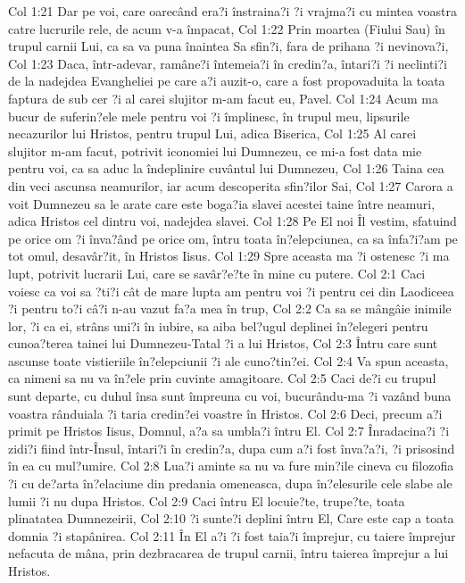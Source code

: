 Col 1:21  Dar pe voi, care oarecând era?i înstraina?i ?i vrajma?i cu mintea voastra catre lucrurile rele, de acum v-a împacat,
Col 1:22  Prin moartea (Fiului Sau) în trupul carnii Lui, ca sa va puna înaintea Sa sfin?i, fara de prihana ?i nevinova?i,
Col 1:23  Daca, într-adevar, ramâne?i întemeia?i în credin?a, întari?i ?i neclinti?i de la nadejdea Evangheliei pe care a?i auzit-o, care a fost propovaduita la toata faptura de sub cer ?i al carei slujitor m-am facut eu, Pavel.
Col 1:24  Acum ma bucur de suferin?ele mele pentru voi ?i împlinesc, în trupul meu, lipsurile necazurilor lui Hristos, pentru trupul Lui, adica Biserica,
Col 1:25  Al carei slujitor m-am facut, potrivit iconomiei lui Dumnezeu, ce mi-a fost data mie pentru voi, ca sa aduc la îndeplinire cuvântul lui Dumnezeu,
Col 1:26  Taina cea din veci ascunsa neamurilor, iar acum descoperita sfin?ilor Sai,
Col 1:27  Carora a voit Dumnezeu sa le arate care este boga?ia slavei acestei taine între neamuri, adica Hristos cel dintru voi, nadejdea slavei.
Col 1:28  Pe El noi Îl vestim, sfatuind pe orice om ?i înva?ând pe orice om, întru toata în?elepciunea, ca sa înfa?i?am pe tot omul, desavâr?it, în Hristos Iisus.
Col 1:29  Spre aceasta ma ?i ostenesc ?i ma lupt, potrivit lucrarii Lui, care se savâr?e?te în mine cu putere.
Col 2:1  Caci voiesc ca voi sa ?ti?i cât de mare lupta am pentru voi ?i pentru cei din Laodiceea ?i pentru to?i câ?i n-au vazut fa?a mea în trup,
Col 2:2  Ca sa se mângâie inimile lor, ?i ca ei, strâns uni?i în iubire, sa aiba bel?ugul deplinei în?elegeri pentru cunoa?terea tainei lui Dumnezeu-Tatal ?i a lui Hristos,
Col 2:3  Întru care sunt ascunse toate vistieriile în?elepciunii ?i ale cuno?tin?ei.
Col 2:4  Va spun aceasta, ca nimeni sa nu va în?ele prin cuvinte amagitoare.
Col 2:5  Caci de?i cu trupul sunt departe, cu duhul însa sunt împreuna cu voi, bucurându-ma ?i vazând buna voastra rânduiala ?i taria credin?ei voastre în Hristos.
Col 2:6  Deci, precum a?i primit pe Hristos Iisus, Domnul, a?a sa umbla?i întru El.
Col 2:7  Înradacina?i ?i zidi?i fiind într-Însul, întari?i în credin?a, dupa cum a?i fost înva?a?i, ?i prisosind în ea cu mul?umire.
Col 2:8  Lua?i aminte sa nu va fure min?ile cineva cu filozofia ?i cu de?arta în?elaciune din predania omeneasca, dupa în?elesurile cele slabe ale lumii ?i nu dupa Hristos.
Col 2:9  Caci întru El locuie?te, trupe?te, toata plinatatea Dumnezeirii,
Col 2:10  ?i sunte?i deplini întru El, Care este cap a toata domnia ?i stapânirea.
Col 2:11  În El a?i ?i fost taia?i împrejur, cu taiere împrejur nefacuta de mâna, prin dezbracarea de trupul carnii, întru taierea împrejur a lui Hristos.
